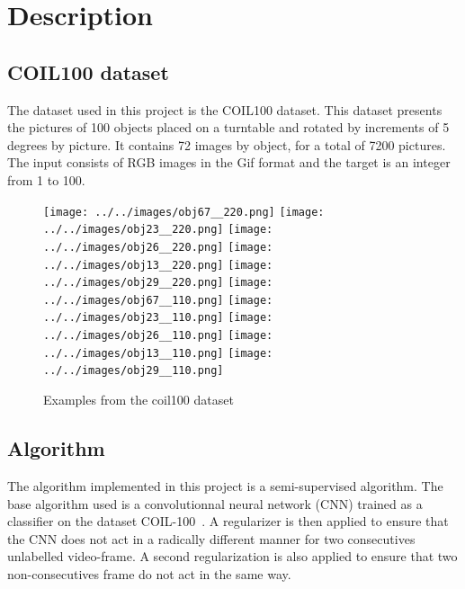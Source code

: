 \documentclass{article} %
\begin{document}
\section{Description}
\subsection{COIL100 dataset}

The dataset used in this project is the COIL100 dataset\cite{Mobahi2009}. This dataset presents the pictures of 100 objects placed on a turntable and rotated by increments of 5 degrees by picture. It contains 72 images by object, for a total of 7200 pictures. The input consists of RGB images in the Gif format and the target is an integer from 1 to 100.

\begin{figure}[h]
\label{fig:coil100}
\center
\texttt{[image: ../../images/obj67\_\_220.png]} 
\texttt{[image: ../../images/obj23\_\_220.png]} 
\texttt{[image: ../../images/obj26\_\_220.png]} 
\texttt{[image: ../../images/obj13\_\_220.png]} 
\texttt{[image: ../../images/obj29\_\_220.png]}  
\texttt{[image: ../../images/obj67\_\_110.png]} 
\texttt{[image: ../../images/obj23\_\_110.png]} 
\texttt{[image: ../../images/obj26\_\_110.png]} 
\texttt{[image: ../../images/obj13\_\_110.png]} 
\texttt{[image: ../../images/obj29\_\_110.png]}  
\caption{Examples from the coil100 dataset}
\end{figure}

\subsection{Algorithm}
The algorithm implemented in this project is a semi-supervised algorithm. The base algorithm used is a convolutionnal neural network (CNN) trained as a classifier on the dataset COIL-100~\cite{Mobahi2009}. A regularizer is then applied to ensure that the CNN does not act in a radically different manner for two consecutives unlabelled video-frame. A second regularization is also applied to ensure that two non-consecutives frame do not act in the same way.
\end{document}
